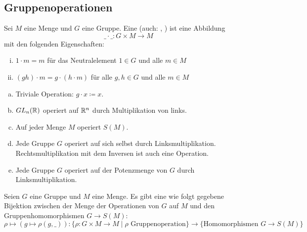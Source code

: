 \subsection{Gruppenoperationen}

\begin{definition}
  Sei \(M\) eine Menge und \(G\) eine Gruppe.
  Eine  (auch: , )
  ist eine Abbildung
  \[
  \_\cdot\_:G\times M\to M
  \]
  mit den folgenden Eigenschaften:
  \begin{enumerate}[(i)]
  \item \(1\cdot m=m\) für das Neutralelement \(1\in G\) und alle \(m\in M\)
  \item \((gh)\cdot m=g\cdot (h\cdot m)\) für alle \(g,h\in G\) und alle \(m\in M\)
  \end{enumerate}
\end{definition}

\begin{beispiel}
  \begin{enumerate}[(a)]
  \item Triviale Operation: \(g\cdot x\coloneq x\).
  \item \(GL_n(\mathbb{R})\) operiert auf \(\mathbb{R}^n\) durch Multiplikation von links.
  \item Auf jeder Menge \(M\) operiert \(S(M)\).
  \item Jede Gruppe \(G\) operiert auf sich selbst durch Linksmultiplikation.
   Rechtsmultiplikation mit dem Inversen ist auch eine Operation.
  \item Jede Gruppe \(G\) operiert auf der Potenzmenge von \(G\) durch Linksmultiplikation.
  \end{enumerate}
\end{beispiel}

\begin{bemerkung}
  Seien \(G\) eine Gruppe und \(M\) eine Menge.
  Es gibt eine wie folgt gegebene Bijektion zwischen der Menge
  der Operationen von \(G\) auf \(M\) und den Gruppenhomomorphismen \(G\to S(M)\):
  \[
    \rho\mapsto (g\mapsto \rho(g,\_) ):\{\rho:G\times M\to M\mid \rho\text{ Gruppenoperation}\} \to \{\text{Homomorphismen } G\to S(M)\}
  \]
\end{bemerkung}

